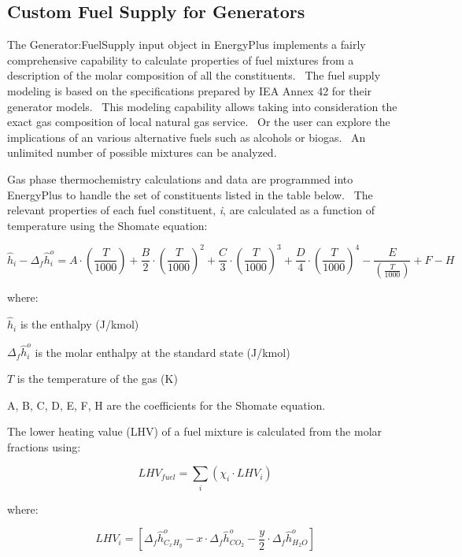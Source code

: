 \subsection{Custom Fuel Supply for Generators}\label{custom-fuel-supply-for-generators}

The Generator:FuelSupply input object in EnergyPlus implements a fairly comprehensive capability to calculate properties of fuel mixtures from a description of the molar composition of all the constituents.~ The fuel supply modeling is based on the specifications prepared by IEA Annex 42 for their generator models.~ This modeling capability allows taking into consideration the exact gas composition of local natural gas service.~ Or the user can explore the implications of an various alternative fuels such as alcohols or biogas.~ An unlimited number of possible mixtures can be analyzed.

Gas phase thermochemistry calculations and data are programmed into EnergyPlus to handle the set of constituents listed in the table below.~ The relevant properties of each fuel constituent, \emph{i}, are calculated as a function of temperature using the Shomate equation:

\begin{equation}
{\hat h_i} - {\Delta_f}\hat h_i^o = A \cdot \left( {\frac{T}{{1000}}} \right) + \frac{B}{2} \cdot {\left( {\frac{T}{{1000}}} \right)^2} + \frac{C}{3} \cdot {\left( {\frac{T}{{1000}}} \right)^3} + \frac{D}{4} \cdot {\left( {\frac{T}{{1000}}} \right)^4} - \frac{E}{{\left( {\frac{T}{{1000}}} \right)}} + F - H
\end{equation}

where:

\({\hat h_i}\) is the enthalpy (J/kmol)

\({\Delta_f}\hat h_i^o\) is the molar enthalpy at the standard state (J/kmol)

\(T\) is the temperature of the gas (K)

A, B, C, D, E, F, H are the coefficients for the Shomate equation.

The lower heating value (LHV) of a fuel mixture is calculated from the molar fractions using:

\begin{equation}
LH{V_{fuel}} = \sum\limits_i {\left( {{\chi_i} \cdot LH{V_i}} \right)}
\end{equation}

where:

\begin{equation}
LH{V_i} = \left[ {{\Delta_f}\hat h_{{C_x}{H_y}}^o - x \cdot {\Delta_f}\hat h_{C{O_2}}^o - \frac{y}{2} \cdot {\Delta_f}\hat h_{{H_2}O}^o} \right]
\end{equation}

